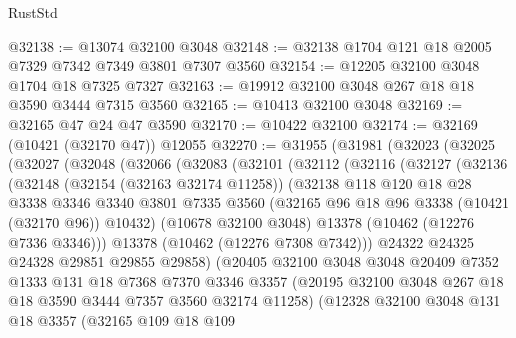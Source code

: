 \begin{lexlean}{RustStd}
\begin{coremodule}
@32138 := @13074 @32100 @3048
@32148 := @32138 @1704 @121 @18 @2005 @7329 @7342 @7349 @3801 @7307 @3560
@32154 := @12205 @32100 @3048 @1704 @18 @7325 @7327
@32163 := @19912 @32100 @3048 @267 @18 @18 @3590 @3444 @7315 @3560
@32165 := @10413 @32100 @3048
@32169 := @32165 @47 @24 @47 @3590
@32170 := @10422 @32100
@32174 := @32169 (@10421 (@32170 @47)) @12055
@32270 := @31955
    (@31981
      (@32023
        (@32025
          (@32027
            (@32048
              (@32066
                (@32083
                  (@32101
                    (@32112
                      (@32116
                        (@32127
                          (@32136
                            (@32148
                              (@32154 (@32163 @32174 @11258))
                              (@32138
                                @118
                                @120
                                @18
                                @28
                                @3338
                                @3346
                                @3340
                                @3801
                                @7335
                                @3560
                                (@32165 @96 @18 @96 @3338 (@10421 (@32170 @96)) @10432)
                                (@10678 @32100 @3048)
                                @13378
                                (@10462 (@12276 @7336 @3346)))
                              @13378
                              (@10462 (@12276 @7308 @7342)))
                            @24322
                            @24325
                            @24328
                            @29851
                            @29855
                            @29858)
                          (@20405
                            @32100
                            @3048
                            @3048
                            @20409
                            @7352
                            @1333
                            @131
                            @18
                            @7368
                            @7370
                            @3346
                            @3357
                            (@20195 @32100 @3048 @267 @18 @18 @3590 @3444 @7357 @3560 @32174 @11258)
                            (@12328
                              @32100
                              @3048
                              @131
                              @18
                              @3357
                              (@32165
                                @109
                                @18
                                @109

\end{coremodule}
\end{lexlean}
